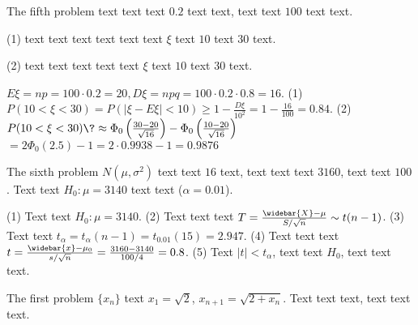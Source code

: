 \documentclass[12pt,most]{randexam}
\begin{document}
\vfill

\newpage

\begin{problem}
The fifth problem text text text $0.2$ text text, text text $100$ text text.\par
(1) text text text text text text $\xi$ text $10$ text $30$ text.\par
(2) text text text text text $\xi$ text $10$ text $30$ text.
\end{problem}

\smallskip

\begin{solution}
$E\xi = n p = 100 \cdot 0.2 = 20, D\xi = n p q = 100 \cdot 0.2 \cdot 0.8 = 16$. 
(1) $P (10 < \xi < 30) = P (|\xi - E\xi| < 10) \ge 1 - \frac{D\xi}{10^2}
     = 1 - \frac{16}{100} = 0.84$. 
(2) $P (10 < \xi < 30) \? \approx \Phi_0\left(\frac{30 - 20}{\sqrt{16}}\right)
         - \Phi_0\left(\frac{10 - 20}{\sqrt{16}}\right)$ 
      \+ $= 2 \Phi_0(2.5) - 1 = 2 \cdot 0.9938 - 1 =0.9876$ 
\end{solution}

\vfill

\begin{problem}
The sixth problem $N(\mu,\sigma^2)$ text text $16$ text, text text text $3160$, text text $100$.
Text text $H_0:\mu=3140$ text text ($\alpha = 0.01$).
\end{problem}

\smallskip

\begin{solution}
(1) Text text $H_0 : \mu = 3140$. 
(2) Text text text $T = \frac{\widebar{X}-\mu}{S / \sqrt{n}} \sim t(n-1)$. 
(3) Text text $t_{\alpha} = t_{\alpha} (n - 1) = t_{0.01} (15) =2.947$. 
(4) Text text text $t = \frac{\widebar{x} - \mu_0}{s/\sqrt{n}} =\frac{3160-3140}{100/4} = 0.8$.
(5) Text $| t | < t_{\alpha}$, text text $H_0$, text text text. 
\end{solution}

\vfill

\newpage


\renewcommand{\solutionname}{Proof} %

\begin{problem}
The first problem $\{x_n\}$ text $x_1=\sqrt2$, $x_{n+1}=\sqrt{2+x_n}$.
Text text text, text text text.
\end{problem}
\end{document}
